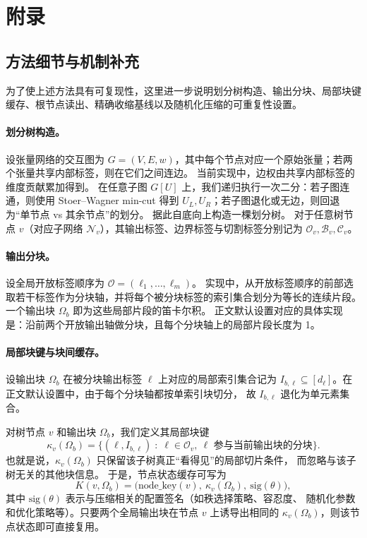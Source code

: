 \section{附录}

\subsection{方法细节与机制补充}
\label{app:method-details}

为了使上述方法具有可复现性，这里进一步说明划分树构造、输出分块、局部块键缓存、根节点读出、精确收缩基线以及随机化压缩的可重复性设置。

\paragraph{划分树构造。}
设张量网络的交互图为 $G=(V,E,w)$，其中每个节点对应一个原始张量；若两个张量共享内部标签，则在它们之间连边。
当前实现中，边权由共享内部标签的维度贡献累加得到。
在任意子图 $G[U]$ 上，我们递归执行一次二分：若子图连通，则使用 Stoer--Wagner min-cut 得到 $U_L,U_R$；若子图退化或无边，则回退为“单节点 vs 其余节点”的划分。
据此自底向上构造一棵划分树。
对于任意树节点 $v$（对应子网络 $\mathcal N_v$），其输出标签、边界标签与切割标签分别记为 $\mathcal O_v,\mathcal B_v,\mathcal C_v$。

\paragraph{输出分块。}
设全局开放标签顺序为 $\mathcal O=(\ell_1,\ldots,\ell_m)$。
实现中，从开放标签顺序的前部选取若干标签作为分块轴，并将每个被分块标签的索引集合划分为等长的连续片段。
一个输出块 $\Omega_b$ 即为这些局部片段的笛卡尔积。
正文默认设置对应的具体实现是：沿前两个开放输出轴做分块，且每个分块轴上的局部片段长度为 1。

\paragraph{局部块键与块间缓存。}
设输出块 $\Omega_b$ 在被分块输出标签 $\ell$ 上对应的局部索引集合记为
$ I_{b,\ell}\subseteq [d_\ell] $。在正文默认设置中，由于每个分块轴都按单索引块切分，
故 $I_{b,\ell}$ 退化为单元素集合。

对树节点 $v$ 和输出块 $\Omega_b$，我们定义其局部块键
\[
\kappa_v(\Omega_b)
=
\bigl\{(\ell, I_{b,\ell}) \;:\; \ell\in \mathcal O_v,\ \ell \text{ 参与当前输出块的分块}\bigr\}.
\]
也就是说，$\kappa_v(\Omega_b)$ 只保留该子树真正“看得见”的局部切片条件，
而忽略与该子树无关的其他块信息。
于是，节点状态缓存可写为
\[
K(v,\Omega_b)=\bigl(\mathrm{node\_key}(v),\ \kappa_v(\Omega_b),\ \mathrm{sig}(\theta)\bigr),
\]
其中 $\mathrm{sig}(\theta)$ 表示与压缩相关的配置签名（如秩选择策略、容忍度、
随机化参数和优化策略等）。只要两个全局输出块在节点 $v$ 上诱导出相同的
$\kappa_v(\Omega_b)$，则该节点状态即可直接复用。

